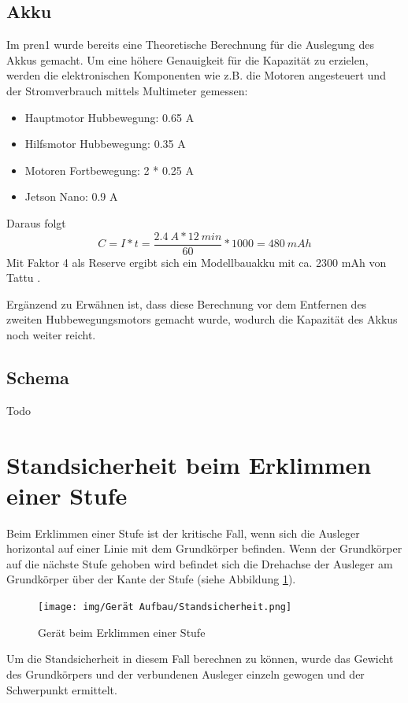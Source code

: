 \subsection{Akku}
Im \acrshort{pren1} wurde bereits eine Theoretische Berechnung für die Auslegung des Akkus gemacht. Um eine höhere Genauigkeit für die Kapazität zu erzielen, werden die elektronischen Komponenten wie z.B. die Motoren angesteuert und der Stromverbrauch mittels Multimeter gemessen:
\begin{itemize}
    \item Hauptmotor Hubbewegung: 0.65 A
    \item Hilfsmotor Hubbewegung: 0.35 A
    \item Motoren Fortbewegung: 2 * 0.25 A
    \item Jetson Nano: 0.9 A
\end{itemize}
Daraus folgt 
\[C = {I*t} = \frac{2.4\ A* 12\ min}{60} * 1000 = 480\ mAh\]
Mit Faktor 4 als Reserve ergibt sich ein Modellbauakku mit ca. 2300 mAh von Tattu \cite{Akku-Modellbau}.

Ergänzend zu Erwähnen ist, dass diese Berechnung vor dem Entfernen des zweiten Hubbewegungsmotors gemacht wurde, wodurch die Kapazität des Akkus noch weiter reicht.

\subsection{Schema}

Todo

\newpage

\section{Standsicherheit beim Erklimmen einer Stufe}

Beim Erklimmen einer Stufe ist der kritische Fall, wenn sich die Ausleger horizontal auf einer Linie mit dem Grundkörper befinden. Wenn der Grundkörper auf die nächste Stufe gehoben wird befindet sich die Drehachse der Ausleger am Grundkörper über der Kante der Stufe (siehe Abbildung \ref{fig:Erklimmen}).

\begin{figure}[h]
  \texttt{[image: img/Gerät Aufbau/Standsicherheit.png]}
  \centering
  \caption{Gerät beim Erklimmen einer Stufe}
  \label{fig:Erklimmen}
\end{figure}

Um die Standsicherheit in diesem Fall berechnen zu können, wurde das Gewicht des Grundkörpers und der verbundenen Ausleger einzeln gewogen und der Schwerpunkt ermittelt.\\

